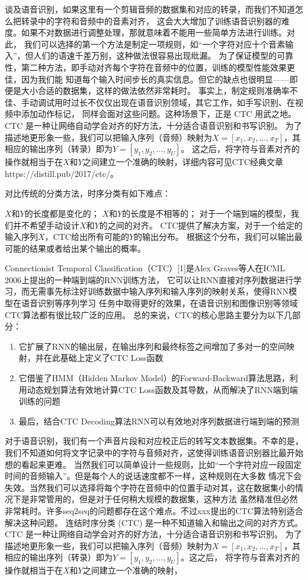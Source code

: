 \documentclass[12pt,a4paper,fancyhdr,openany,oneside]{ctexbook}
\begin{document}
谈及语音识别，如果这里有一个剪辑音频的数据集和对应的转录，而我们不知道怎么把转录中的字符和音频中的音素对齐，
这会大大增加了训练语音识别器的难度。如果不对数据进行调整处理，那就意味着不能用一些简单方法进行训练。对此，
我们可以选择的第一个方法是制定一项规则，如“一个字符对应十个音素输入”，但人们的语速千差万别，这种做法很容易出现纰漏。
为了保证模型的可靠性，第二种方法，即手动对齐每个字符在音频中的位置，训练的模型性能效果更佳，因为我们能
知道每个输入时间步长的真实信息。但它的缺点也很明显——即便是大小合适的数据集，这样的做法依然非常耗时。
事实上，制定规则准确率不佳、手动调试用时过长不仅仅出现在语音识别领域，其它工作，如手写识别、在视频中添加动作标记，
同样会面对这些问题。这种场景下，正是 CTC 用武之地。 CTC 是一种让网络自动学会对齐的好方法，十分适合语音识别和书写识别。
为了描述地更形象一些，我们可以把输入序列（音频）映射为$X=[x_1,x_2,…,x_T]$，其相应的输出序列（转录）即为$Y=[y_1,y_2,…,y_U]$。
这之后，将字符与音素对齐的操作就相当于在$X$和$Y$之间建立一个准确的映射，详细内容可见CTC经典文章https://distill.pub/2017/ctc/。

对比传统的分类方法，时序分类有如下难点：

$X$和$Y$的长度都是变化的；
$X$和$Y$的长度是不相等的；
对于一个端到端的模型，我们并不希望手动设计$X$和$Y$的之间的对齐。
CTC提供了解决方案，对于一个给定的输入序列$X$，CTC给出所有可能的$Y$的输出分布。
根据这个分布，我们可以输出最可能的结果或者给出某个输出的概率。


Connectionist Temporal Classification（CTC）[1]是Alex Graves等人在ICML 2006上提出的一种端到端的RNN训练方法，
它可以让RNN直接对序列数据进行学习，而无需事先标注好训练数据中输入序列和输入序列的映射关系，使得RNN模型在语音识别等序列学习
任务中取得更好的效果，在语音识别和图像识别等领域CTC算法都有很比较广泛的应用。
总的来说，CTC的核心思路主要分为以下几部分：
\begin{enumerate}
    \item 它扩展了RNN的输出层，在输出序列和最终标签之间增加了多对一的空间映射，并在此基础上定义了CTC Loss函数
    \item 它借鉴了HMM（Hidden Markov Model）的Forward-Backward算法思路，利用动态规划算法有效地计算CTC Loss函数及其导数，从而解决了RNN端到端训练的问题
    \item 最后，结合CTC Decoding算法RNN可以有效地对序列数据进行端到端的预测
\end{enumerate}


对于语音识别，我们有一个声音片段和对应校正后的转写文本数据集。不幸的是，我们不知道如何将文字记录中的字符与音频对齐，这使得训练语音识别器比最开始想的看起来更难。
当然我们可以简单设计一些规则，比如“一个字符对应一段固定时间的音频输入”。但是每个人的说话速度都不一样，这种规则在大多数
情况下会失效。当然我们可以选择将每个字符在音频中的位置手动对其，这在数据集小的情况下是非常管用的，但是对于任何稍大规模的数据集，这种方法
虽然精准但必然非常耗时。许多seq2seq的问题都存在这个难点。不过xxx提出的CTC算法特别适合解决这种问题。
连结时序分类 (CTC) 是一种不知道输入和输出之间的对齐方式。CTC 是一种让网络自动学会对齐的好方法，十分适合语音识别和书写识别。
为了描述地更形象一些，我们可以把输入序列（音频）映射为$X=[x_1,x_2,…,x_T]$，其相应的输出序列（转录）即为$Y=[y_1,y_2,…,y_U]$。这之后，
将字符与音素对齐的操作就相当于在$X$和$Y$之间建立一个准确的映射，
\end{document}
